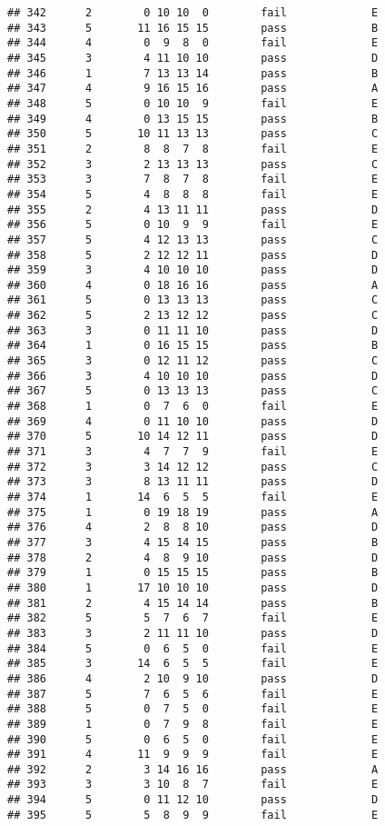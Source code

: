 \documentclass[
]{article}
\begin{document}
\begin{verbatim}
## 342      2        0 10 10  0        fail             E
## 343      5       11 16 15 15        pass             B
## 344      4        0  9  8  0        fail             E
## 345      3        4 11 10 10        pass             D
## 346      1        7 13 13 14        pass             B
## 347      4        9 16 15 16        pass             A
## 348      5        0 10 10  9        fail             E
## 349      4        0 13 15 15        pass             B
## 350      5       10 11 13 13        pass             C
## 351      2        8  8  7  8        fail             E
## 352      3        2 13 13 13        pass             C
## 353      3        7  8  7  8        fail             E
## 354      5        4  8  8  8        fail             E
## 355      2        4 13 11 11        pass             D
## 356      5        0 10  9  9        fail             E
## 357      5        4 12 13 13        pass             C
## 358      5        2 12 12 11        pass             D
## 359      3        4 10 10 10        pass             D
## 360      4        0 18 16 16        pass             A
## 361      5        0 13 13 13        pass             C
## 362      5        2 13 12 12        pass             C
## 363      3        0 11 11 10        pass             D
## 364      1        0 16 15 15        pass             B
## 365      3        0 12 11 12        pass             C
## 366      3        4 10 10 10        pass             D
## 367      5        0 13 13 13        pass             C
## 368      1        0  7  6  0        fail             E
## 369      4        0 11 10 10        pass             D
## 370      5       10 14 12 11        pass             D
## 371      3        4  7  7  9        fail             E
## 372      3        3 14 12 12        pass             C
## 373      3        8 13 11 11        pass             D
## 374      1       14  6  5  5        fail             E
## 375      1        0 19 18 19        pass             A
## 376      4        2  8  8 10        pass             D
## 377      3        4 15 14 15        pass             B
## 378      2        4  8  9 10        pass             D
## 379      1        0 15 15 15        pass             B
## 380      1       17 10 10 10        pass             D
## 381      2        4 15 14 14        pass             B
## 382      5        5  7  6  7        fail             E
## 383      3        2 11 11 10        pass             D
## 384      5        0  6  5  0        fail             E
## 385      3       14  6  5  5        fail             E
## 386      4        2 10  9 10        pass             D
## 387      5        7  6  5  6        fail             E
## 388      5        0  7  5  0        fail             E
## 389      1        0  7  9  8        fail             E
## 390      5        0  6  5  0        fail             E
## 391      4       11  9  9  9        fail             E
## 392      2        3 14 16 16        pass             A
## 393      3        3 10  8  7        fail             E
## 394      5        0 11 12 10        pass             D
## 395      5        5  8  9  9        fail             E
\end{verbatim}
\end{document}
